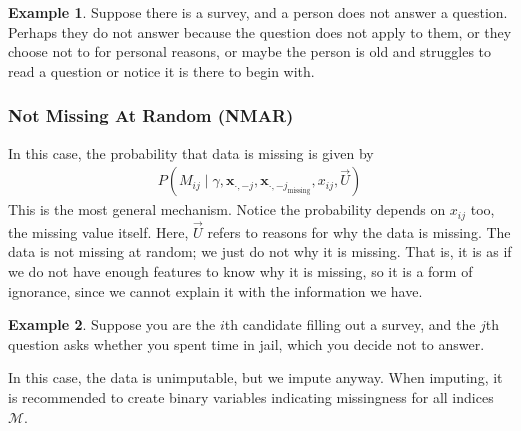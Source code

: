 \documentclass[12pt, a4paper]{article}
\theoremstyle{definition}
\newtheorem*{example}{Example}
\begin{document}
	\begin{tcolorbox}[breakable]
		\begin{example}
			Suppose there is a survey, and a person does not answer a question.
			Perhaps they do not answer because the question does not apply to them, or
			they choose not to for personal reasons, or maybe the person is old and struggles
			to read a question or notice it is there to begin with.
		\end{example}
	\end{tcolorbox}
	\subsubsection{Not Missing At Random (NMAR)}
	In this case, the probability that data is missing is given by
	\begin{align*}
		P\left(
		M_{ij} \mid \gamma, \bm{x}_{\cdot, -j}, \bm{x}_{\cdot, -j_{\text{missing}}},x_{ij}, \vec{U}
		\right)
	\end{align*}
	This is the most general mechanism. Notice the probability depends on $x_{ij}$ too,
	the missing value itself. Here, $\vec{U}$ refers to reasons for why the data
	is missing. The data is not missing at random; we just do not why it is missing.
	That is, it is as if we do not have enough features to know why it is
	missing, so it is a form of ignorance, since we cannot explain it
	with the information we have.
	\begin{tcolorbox}[breakable]
		\begin{example}
			Suppose you are the $i$th candidate filling out a survey, and the
			$j$th question asks whether you spent time in jail, which you decide
			not to answer.
		\end{example}
	\end{tcolorbox}
	In this case, the data is unimputable, but we impute anyway. When imputing,
	it is recommended to create binary variables indicating missingness for all
	indices $\mathcal{M}$.
	
\end{document}

